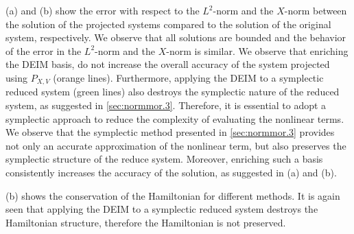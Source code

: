 (a) and (b) show the error with respect to the $L^2$-norm and the $X$-norm between the solution of the projected systems compared to the solution of the original system, respectively. We observe that all solutions are bounded and the behavior of the error in the $L^2$-norm and the $X$-norm is similar. We observe that enriching the DEIM basis, do not increase the overall accuracy of the system projected using $P_{X,V}$ (orange lines). Furthermore, applying the DEIM to a symplectic reduced system (green lines) also destroys the symplectic nature of the reduced system, as suggested in \cref{sec:normmor.3}. Therefore, it is essential to adopt a symplectic approach to reduce the complexity of evaluating the nonlinear terms. We observe that the symplectic method presented in \cref{sec:normmor.3} provides not only an accurate approximation of the nonlinear term, but also preserves the symplectic structure of the reduce system. Moreover, enriching such a basis consistently increases the accuracy of the solution, as suggested in (a) and (b).

(b) shows the conservation of the Hamiltonian for different methods. It is again seen that applying the DEIM to a symplectic reduced system destroys the Hamiltonian structure, therefore the Hamiltonian is not preserved.


